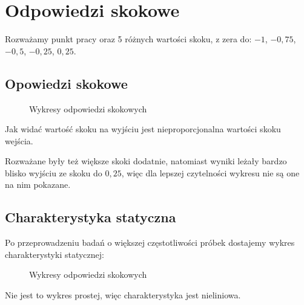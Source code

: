 \chapter{Odpowiedzi skokowe}

Rozważamy punkt pracy oraz 5 różnych wartości skoku, z zera do: $-1$, $-0,75$, $-0,5$, $-0,25$, $0,25$.

\section{Opowiedzi skokowe}

\begin{figure}[H]
\centering

\caption{Wykresy odpowiedzi skokowych}
\end{figure}

Jak widać wartość skoku na wyjściu jest nieproporcjonalna wartości skoku wejścia.

Rozważane były też większe skoki dodatnie, natomiast wyniki leżały bardzo blisko wyjściu ze skoku do $0,25$, więc dla lepszej czytelności wykresu nie są one na nim pokazane.

\section{Charakterystyka statyczna}

Po przeprowadzeniu badań o większej częstotliwości próbek dostajemy wykres charakterystyki statycznej:

\begin{figure}[H]
\centering

\caption{Wykresy odpowiedzi skokowych}
\end{figure}

Nie jest to wykres prostej, więc charakterystyka jest nieliniowa.




